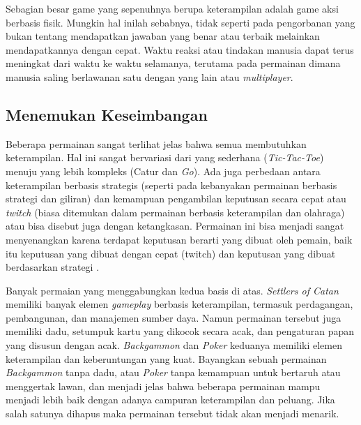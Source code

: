 \begin{subs}
\begin{enumerate}[label=\textbf{\alph*).}]
		Sebagian besar game yang sepenuhnya berupa keterampilan adalah game aksi berbasis fisik. Mungkin hal inilah sebabnya, tidak seperti pada pengorbanan yang bukan tentang mendapatkan jawaban yang benar atau terbaik melainkan mendapatkannya dengan cepat. Waktu reaksi atau tindakan manusia dapat terus meningkat dari waktu ke waktu selamanya, terutama pada permainan dimana manusia saling berlawanan satu dengan yang lain atau \textit{multiplayer}.
		\vspace{1ex}
	\end{enumerate}

	\subsection{Menemukan Keseimbangan}
	\label{sec:sub_sec2_keseimbangan}
	\vspace{1ex}
	
	Beberapa permainan sangat terlihat jelas bahwa semua membutuhkan keterampilan. Hal ini sangat bervariasi dari yang sederhana (\textit{Tic-Tac-Toe}) menuju yang lebih kompleks (Catur dan \textit{Go}). Ada juga perbedaan antara keterampilan berbasis strategis (seperti pada kebanyakan permainan berbasis strategi dan giliran) dan kemampuan pengambilan keputusan secara cepat atau \textit{twitch} (biasa ditemukan dalam permainan berbasis keterampilan dan olahraga) atau bisa disebut juga dengan ketangkasan. Permainan ini bisa menjadi sangat menyenangkan karena terdapat keputusan berarti yang dibuat oleh pemain, baik itu keputusan yang dibuat dengan cepat (twitch) dan keputusan yang dibuat berdasarkan strategi \citep{Brathwaite2009}.
	\vspace{1ex}
	
	Banyak permaian yang menggabungkan kedua basis di atas. \textit{Settlers of Catan} memiliki banyak elemen \textit{gameplay} berbasis keterampilan, termasuk perdagangan, pembangunan, dan manajemen sumber daya. Namun permainan tersebut juga memiliki dadu, setumpuk kartu yang dikocok secara acak, dan pengaturan papan yang disusun dengan acak. \textit{Backgammon} dan \textit{Poker} keduanya memiliki elemen keterampilan dan keberuntungan yang kuat. Bayangkan sebuah permainan \textit{Backgammon} tanpa dadu, atau \textit{Poker} tanpa kemampuan untuk bertaruh atau menggertak lawan, dan menjadi jelas bahwa beberapa permainan mampu menjadi lebih baik dengan adanya campuran keterampilan dan peluang. Jika salah satunya dihapus maka permainan tersebut tidak akan menjadi menarik.
	\vspace{1ex}
	

\end{subs}

